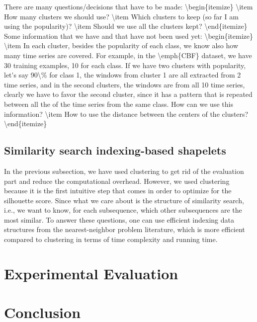 \documentclass[sigconf, nonacm]{acmart}
\begin{document}
\ac{
	There are many questions/decisions that have to be made:
	\begin{itemize}
		\item How many clusters we should use?
		\item Which clusters to keep (so far I am using the popularity)?
		\item Should we use all the clusters kept?
	\end{itemize}
	Some information that we have and that have not been used yet:
	\begin{itemize}
		\item In each cluster, besides the popularity of each class, we know also
		      how many time series are covered. For example, in the \emph{CBF}
		      dataset, we have 30 training examples, 10 for each class. If we have
		      two clusters with popularity, let's say 90\% for class 1, the windows
		      from cluster 1 are all extracted from 2 time series, and in the second
		      clusters, the windows are from all 10 time series, clearly we have to
		      favor the second cluster, since it has a pattern that is repeated
		      between all the of the time series from the same class. How can we
		      use this information?
		\item How to use the distance between the centers of the clusters?
	\end{itemize}
}

\subsection{Similarity search indexing-based shapelets}
In the previous subsection, we have used clustering to get rid of the evaluation
part and reduce the computational overhead. However, we used clustering because
it is the first intuitive step that comes in order to optimize for the 
silhouette score.
Since what we care about is the structure of similarity search, i.e., we want to
know, for each subsequence, which other subsequences are the most similar. To
answer these questions, one can use efficient indexing data structures from the
nearest-neighbor problem literature, which is more efficient compared to 
clustering in terms of time complexity and running time.

\section{Experimental Evaluation}

\section{Conclusion}




\end{document}
